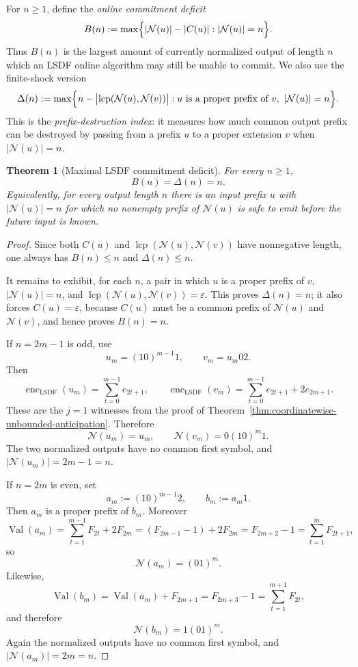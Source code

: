 \documentclass[11pt,letterpaper]{article}
\numberwithin{equation}{section}
\theoremstyle{plain}
\newtheorem{theorem}{Theorem}[section]
\theoremstyle{definition}
\theoremstyle{remark}
\DeclareMathOperator{\Val}{Val}
\DeclareMathOperator{\lcp}{lcp}
\newcommand{\encLSDF}{\operatorname{enc}_{\mathrm{LSDF}}}
\begin{document}
For $n\ge 1$, define the \emph{online commitment deficit}
\[
B(n):=
\max\Bigl\{
|\mathcal N(u)|-|C(u)|:
|\mathcal N(u)|=n
\Bigr\}.
\]
Thus $B(n)$ is the largest amount of currently normalized output of length
$n$ which an LSDF online algorithm may still be unable to commit.  We also
use the finite-shock version
\[
\Delta(n):=
\max\Bigl\{
n-\bigl|\lcp(\mathcal N(u),\mathcal N(v))\bigr|:
u\text{ is a proper prefix of }v,\ |\mathcal N(u)|=n
\Bigr\}.
\]
This is the \emph{prefix-destruction index}: it measures how much common
output prefix can be destroyed by passing from a prefix $u$ to a proper
extension $v$ when $|\mathcal N(u)|=n$.

\begin{theorem}[Maximal LSDF commitment deficit]\label{thm:exact-prefix-destruction}
For every $n\ge 1$,
\[
B(n)=\Delta(n)=n.
\]
Equivalently, for every output length $n$ there is an input prefix $u$ with
$|\mathcal N(u)|=n$ for which no nonempty prefix of $\mathcal N(u)$ is safe to
emit before the future input is known.
\end{theorem}

\begin{proof}
Since both $C(u)$ and $\lcp(\mathcal N(u),\mathcal N(v))$ have nonnegative
length, one always has $B(n)\le n$ and $\Delta(n)\le n$.

It remains to exhibit, for each $n$, a pair in which $u$ is a proper prefix
of $v$, $|\mathcal N(u)|=n$, and
$\lcp(\mathcal N(u),\mathcal N(v))=\varepsilon$.  This proves $\Delta(n)=n$; it also
forces $C(u)=\varepsilon$, because $C(u)$ must be a common prefix of
$\mathcal N(u)$ and $\mathcal N(v)$, and hence proves $B(n)=n$.

If $n=2m-1$ is odd, use
\[
u_m=(10)^{m-1}1,
\qquad
v_m=u_m02.
\]
Then
\[
\encLSDF(u_m)=\sum_{t=0}^{m-1} e_{2t+1},
\qquad
\encLSDF(v_m)=\sum_{t=0}^{m-1} e_{2t+1}+2e_{2m+1}.
\]
These are the $j=1$ witnesses from the proof of
Theorem~\ref{thm:coordinatewise-unbounded-anticipation}.  Therefore
\[
\mathcal N(u_m)=u_m,
\qquad
\mathcal N(v_m)=0(10)^m1.
\]
The two normalized outputs have no common first symbol, and
$|\mathcal N(u_m)|=2m-1=n$.

If $n=2m$ is even, set
\[
a_m:=(10)^{m-1}2,
\qquad
b_m:=a_m1.
\]
Then $a_m$ is a proper prefix of $b_m$.  Moreover
\[
\Val(a_m)=\sum_{t=1}^{m-1}F_{2t}+2F_{2m}
=(F_{2m-1}-1)+2F_{2m}=F_{2m+2}-1
=\sum_{t=1}^{m}F_{2t+1},
\]
so
\[
\mathcal N(a_m)=(01)^m.
\]
Likewise,
\[
\Val(b_m)=\Val(a_m)+F_{2m+1}=F_{2m+3}-1
=\sum_{t=1}^{m+1}F_{2t},
\]
and therefore
\[
\mathcal N(b_m)=1(01)^m.
\]
Again the normalized outputs have no common first symbol, and
$|\mathcal N(a_m)|=2m=n$.
\end{proof}
\end{document}
